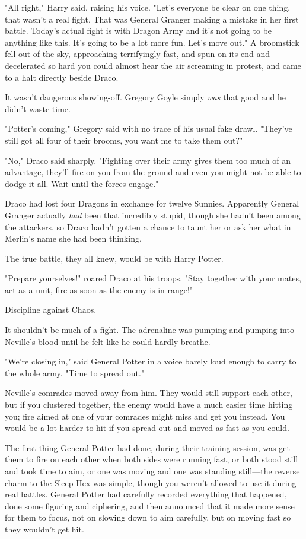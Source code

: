 "All right," Harry said, raising his voice. "Let's everyone be clear on one
thing, that wasn't a real fight. That was General Granger making a mistake in
her first battle. Today's actual fight is with Dragon Army and it's not going
to be anything like this. It's going to be a lot more fun. Let's move out."
\sbreak
A broomstick fell out of the sky, approaching terrifyingly fast, and spun on
its end and decelerated so hard you could almost hear the air screaming in
protest, and came to a halt directly beside Draco.

It wasn't dangerous showing-off. Gregory Goyle simply \emph{was} that good and
he didn't waste time.

"Potter's coming," Gregory said with no trace of his usual fake drawl. "They've
still got all four of their brooms, you want me to take them out?"

"No," Draco said sharply. "Fighting over their army gives them too much of an
advantage, they'll fire on you from the ground and even you might not be able
to dodge it all. Wait until the forces engage."

Draco had lost four Dragons in exchange for twelve Sunnies. Apparently General
Granger actually \emph{had} been that incredibly stupid, though she hadn't been
among the attackers, so Draco hadn't gotten a chance to taunt her or ask her
what in Merlin's name she had been thinking.

The true battle, they all knew, would be with Harry Potter.

"Prepare yourselves!" roared Draco at his troops. "Stay together with your
mates, act as a unit, fire as soon as the enemy is in range!"

Discipline against Chaos.

It shouldn't be much of a fight.
\sbreak
The adrenaline was pumping and pumping into Neville's blood until he felt like
he could hardly breathe.

"We're closing in," said General Potter in a voice barely loud enough to carry
to the whole army. "Time to spread out."

Neville's comrades moved away from him. They would still support each other,
but if you clustered together, the enemy would have a much easier time hitting
you; fire aimed at one of your comrades might miss and get you instead. You
would be a lot harder to hit if you spread out and moved as fast as you could.

The first thing General Potter had done, during their training session, was get
them to fire on each other when both sides were running fast, or both stood
still and took time to aim, or one was moving and one was standing still---the
reverse charm to the Sleep Hex was simple, though you weren't allowed to use it
during real battles. General Potter had carefully recorded everything that
happened, done some figuring and ciphering, and then announced that it made
more sense for them to focus, not on slowing down to aim carefully, but on
moving fast so they wouldn't get hit.

